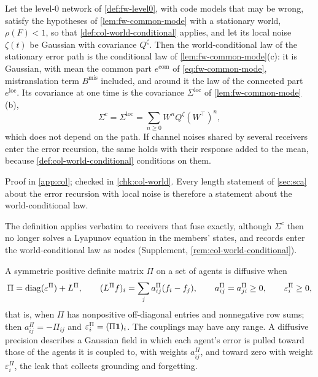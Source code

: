 \begin{proposition}\label{prop:col-world-conditional}
Let the level-0 network of \cref{def:fw-level0}, with code models that may be wrong, satisfy the hypotheses of \cref{lem:fw-common-mode} with a stationary world, $\rho(F)<1$, so that \cref{def:col-world-conditional} applies, and let its local noise $\zeta(t)$ be Gaussian with covariance $Q^\zeta$. Then the world-conditional law of the stationary error path is the conditional law of \cref{lem:fw-common-mode}(c): it is Gaussian, with mean the common part $e^{\mathrm{com}}$ of \eqref{eq:fw-common-mode}, mistranslation term $B^{\mathrm{mis}}$ included, and around it the law of the connected part $e^{\mathrm{loc}}$. Its covariance at one time is the covariance $\Sigma^{\mathrm{loc}}$ of \cref{lem:fw-common-mode}(b),
\begin{equation}\label{eq:col-sigma-c}
\Sigma^c=\Sigma^{\mathrm{loc}}=\sum_{n\ge0}W^nQ^\zeta(W^\top)^n,
\end{equation}
which does not depend on the path. If channel noises shared by several receivers enter the error recursion, the same holds with their response added to the mean, because \cref{def:col-world-conditional} conditions on them.
\end{proposition}
Proof in \cref{app:col}; checked in \cref{chk:col-world}. Every length statement of \cref{sec:sca} about the error recursion with local noise is therefore a statement about the world-conditional law.

The definition applies verbatim to receivers that fuse exactly, although $\Sigma^c$ then no longer solves a Lyapunov equation in the members' states, and records enter the world-conditional law as nodes (Supplement, \cref{rem:col-world-conditional}).

A symmetric positive definite matrix $\Pi$ on a set of agents is diffusive when
\begin{equation}\label{eq:col-diffusive}
\Pi=\operatorname{diag}(\varepsilon^\Pi)+L^\Pi,\qquad(L^\Pi f)_i=\sum_ja^\Pi_{ij}(f_i-f_j),\qquad a^\Pi_{ij}=a^\Pi_{ji}\ge0,\qquad\varepsilon^\Pi_i\ge0,
\end{equation}
that is, when $\Pi$ has nonpositive off-diagonal entries and nonnegative row sums; then $a^\Pi_{ij}=-\Pi_{ij}$ and $\varepsilon^\Pi_i=(\Pi\mathbf{1})_i$. The couplings may have any range. A diffusive precision describes a Gaussian field in which each agent's error is pulled toward those of the agents it is coupled to, with weights $a^\Pi_{ij}$, and toward zero with weight $\varepsilon^\Pi_i$, the leak that collects grounding and forgetting.

